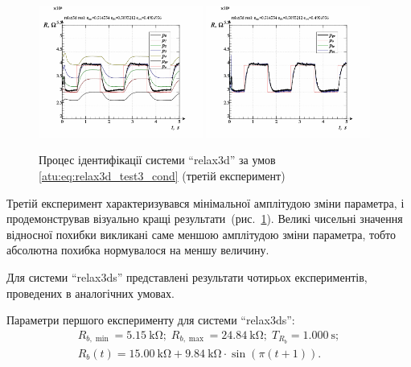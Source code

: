 \begin{figure}[htb!]
  \centerline{
    \includegraphics[width=0.48\textwidth]{p/relax3d_read_id2-p_p_02.png}
    \hfill
    \includegraphics[width=0.48\textwidth]{p/relax3d_read_id2-p_pp_02.png}
  }
\caption{Процес ідентифікації системи ``relax3d'' за умов \ref{atu:eq:relax3d_test3_cond} (третій експеримент)}
\label{atu:f:relax3d_id_3}
\end{figure}

Третій експеримент характеризувався мінімальної амплітудою
зміни параметра, і продемонстрував візуально кращі
результати~(рис.~\ref{atu:f:relax3d_id_3}). Великі чисельні значення
відносної похибки викликані саме меншою амплітудою зміни
параметра, тобто абсолютна похибка нормувалося на меншу
величину.




Для системи ``relax3ds'' представлені результати чотирьох
експериментів, проведених в аналогічних умовах.

Параметри першого експерименту для системи ``relax3ds'':
%
\begin{equation}
  \begin{array}{c}
    R_{b,\min} = \SI{5.15}{\kilo\ohm};
    \;
    R_{b,\max} = \SI{24.84}{\kilo\ohm};
    \;
    T_{R_b} = \SI{1.000}{\second};
  \\
    R_b(t) = \SI{15.00}{\kilo\ohm} + \SI{9.84}{\kilo\ohm} \cdot \sin( \pi ( t + 1 ) ).
  \end{array}
  \label{atu:eq:relax3ds_test1_cond}
\end{equation}


